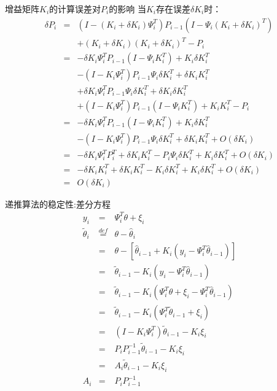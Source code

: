 \begin{frame}{增益矩阵$K_i$的计算误差对$P_i$的影响}
当$K_i$存在误差$\delta K_i$时：
\begin{eqnarray*}
\delta P_i  &=& (I-(K_i+\delta K_i)\Psi_i^T)P_{i-1} (I-\Psi_i (K_i+\delta K_i)^T) \\
&& +(K_i+\delta K_i) (K_i+\delta K_i)^T -P_i  \\
 &=& -\delta K_i\Psi_i^T P_{i-1} (I-\Psi_i K_i^T)+K_i \delta K_i^T  \\
 && -(I-K_i\Psi_i^T)P_{i-1} \Psi_i \delta K_i^T+\delta K_i K_i^T   \\
 && + \delta K_i\Psi_i^T P_{i-1} \Psi_i \delta K_i^T+\delta K_i \delta K_i^T  \\
 && +(I-K_i\Psi_i^T)P_{i-1} (I-\Psi_i K_i^T)+K_i K_i^T -P_i  \\
 &=& -\delta K_i\Psi_i^T P_{i-1} (I-\Psi_i K_i^T)+K_i \delta K_i^T  \\
 && -(I-K_i\Psi_i^T)P_{i-1} \Psi_i \delta K_i^T+\delta K_i K_i^T  +O(\delta K_i) \\
 &=& -\delta K_i\Psi_i^T P_i^T+\delta K_i K_i^T -P_i \Psi_i \delta K_i^T+ K_i \delta K_i^T +O(\delta K_i) \\
 &=& -\delta K_i K_i^T +\delta K_i K_i^T -K_i \delta K_i^T+ K_i \delta K_i^T +O(\delta K_i) \\
 &=& O(\delta K_i) 
\end{eqnarray*}
\end{frame}

\begin{frame}{递推算法的稳定性:差分方程}
\begin{eqnarray*}
y_i &=& \Psi_i^T \theta+\xi_i \\
\tilde\theta_i &\stackrel{def}{=}&\theta-\hat\theta_i \\
&=& \theta-[\hat\theta_{i-1} + K_i (y_i-\Psi_i^T\hat\theta_{i-1})] \\
&=& \tilde\theta_{i-1}-K_i (y_i-\Psi_i^T\hat\theta_{i-1}) \\
&=& \tilde\theta_{i-1}-K_i (\Psi_i^T\theta + \xi_i -\Psi_i^T\hat\theta_{i-1}) \\
&=& \tilde\theta_{i-1}-K_i (\Psi_i^T\tilde\theta_{i-1} + \xi_i ) \\
&=& (I-K_i \Psi_i^T)\tilde\theta_{i-1} - K_i\xi_i \\
&=& P_i P_{i-1}^{-1}\tilde\theta_{i-1} - K_i\xi_i \\
&=& A_i \tilde\theta_{i-1} - K_i\xi_i \\
A_i &=& P_i P_{i-1}^{-1} 
\end{eqnarray*}
\end{frame}

